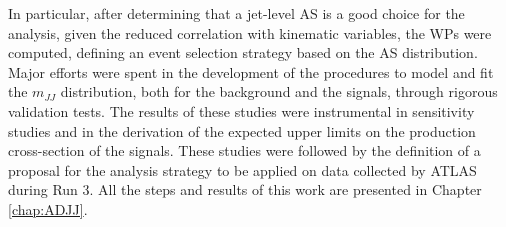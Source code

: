 In particular, after determining that a jet-level AS is a good choice for the analysis, given the reduced correlation with kinematic variables, the WPs were computed, defining an event selection strategy based on the AS distribution.
Major efforts were spent in the development of the procedures to model and fit the $m_{JJ}$ distribution, both for the background and the signals, through rigorous validation tests.
The results of these studies were instrumental in sensitivity studies and in the derivation of the expected upper limits on the production cross-section of the signals.
These studies were followed by the definition of a proposal for the analysis strategy to be applied on data collected by ATLAS during Run 3.
All the steps and results of this work are presented in Chapter \ref{chap:ADJJ}.
 



